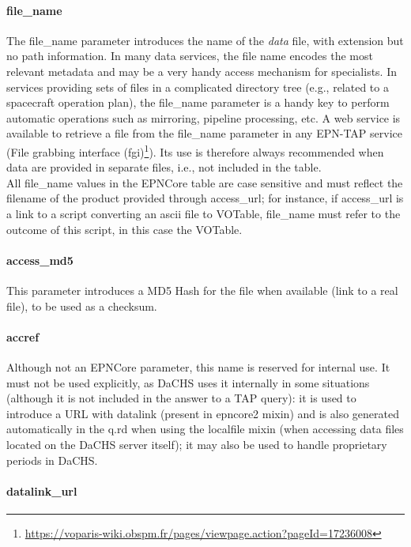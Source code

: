 \documentclass[11pt,a4paper]{ivoa}
\begin{document}
\paragraph{file\_name}

The file\_name parameter introduces the name of the \emph{data}
file, with extension but no path information. In many data services,
the file name encodes the most relevant metadata and may be a
very handy access mechanism for specialists. In services providing
sets of files in a complicated directory tree (e.g., related to
a spacecraft operation plan), the file\_name parameter is a handy
key to perform automatic operations such as mirroring, pipeline
processing, etc.  A web service is available to retrieve a file from
the file\_name parameter in any EPN-TAP service (File grabbing interface
(fgi)\footnote{\url{https://voparis-wiki.obspm.fr/pages/viewpage.action?pageId=17236008}}).
Its use is therefore always recommended when data are provided in separate
files, i.e., not included in the table.\\All file\_name values in the
EPNCore table are case sensitive and must reflect the filename of the
product provided through access\_url; for instance, if access\_url is
a link to a script converting an ascii file to VOTable, file\_name must
refer to the outcome of this script, in this case the VOTable.

\paragraph{access\_md5}

This parameter introduces a MD5 Hash for the file when available
(link to a real file), to be used as a checksum.

\paragraph{accref}

Although not an EPNCore parameter, this name is reserved for internal use.
It must not be used explicitly, as DaCHS uses it internally in some
situations (although it is not included in the answer to a TAP query):
it is used to introduce a URL with datalink (present in epncore2 mixin)
and is also generated automatically in the q.rd when using the localfile
mixin (when accessing data files located on the DaCHS server itself);
it may also be used to handle proprietary periods in DaCHS. \\

\paragraph{datalink\_url}
\end{document}
